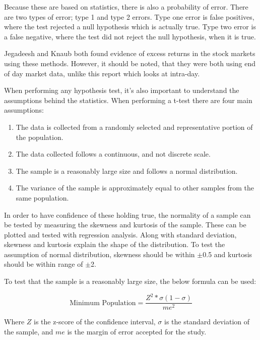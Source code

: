 Because these are based on statistics, there is also a probability of error\cite{hypothesis}. There are two types of error; type 1 and type 2 errors. Type one error is false positives, where the test rejected a null hypothesis which is actually true. Type two error is a false negative, where the test did not reject the null hypothesis, when it is true.

Jegadeesh and Knaub\cite{jegadeesh_returns}\cite{knaub_hypothesis} both found evidence of excess returns in the stock markets using these methods. However, it should be noted, that they were both using end of day market data, unlike this report which looks at intra-day.

When performing any hypothesis test, it's also important to understand the assumptions behind the statistics\cite{black_stats}. When performing a t-test there are four main assumptions:

\begin{enumerate}
    \item The data is collected from a randomly selected and representative portion of the population.
    \item The data collected follows a continuous, and not discrete scale.
    \item The sample is a reasonably large size and follows a normal distribution.
    \item The variance of the sample is approximately equal to other samples from the same population.
\end{enumerate}

In order to have confidence of these holding true, the normality of a sample can be tested by measuring the skewness and kurtosis of the sample\cite{hypothesis}. These can be plotted and tested with regression analysis. Along with standard deviation, skewness and kurtosis explain the shape of the distribution. To test the assumption of normal distribution, skewness should be within $\pm$0.5 and kurtosis should be within range of $\pm$2.

To test that the sample is a reasonably large size, the below formula can be used:

\begin{equation} \label{eq:minpop}
    \text{Minimum Population} = \frac{Z^2 * \sigma (1- \sigma)}{me^2}
\end{equation}

Where $Z$ is the z-score of the confidence interval, $\sigma$ is the standard deviation of the sample, and $me$ is the margin of error accepted for the study\cite{black_stats}.

